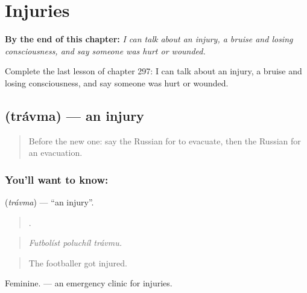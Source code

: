 
\chapter{Injuries}
\label{ch:ru-injuries}

\begin{chapteropening}
\textbf{By the end of this chapter:} \emph{I can talk about an injury, a bruise and losing consciousness, and say someone was hurt or wounded.}

Complete the last lesson of chapter 297: I can talk about an injury, a bruise and losing consciousness, and say someone was hurt or wounded.
\end{chapteropening}

\section[\texorpdfstring{\ru{травма} (trávma)}{травма (trávma)}]{ (trávma) — an injury}

\label{lesson:RU-C297-travma}



\begin{quote}
Before the new one: say the Russian for to evacuate, then the Russian for an evacuation.
\end{quote}

\subsection*{You'll want to know: }
\textbf{} (\emph{trávma}) — \textquotedblleft{}an injury\textquotedblright{}.

\begin{quote}
  .
\end{quote}

\begin{quote}
\emph{Futbolíst poluchíl trávmu.}
\end{quote}

\begin{quote}
The footballer got injured.
\end{quote}

Feminine. \emph{} — an emergency clinic for injuries.


